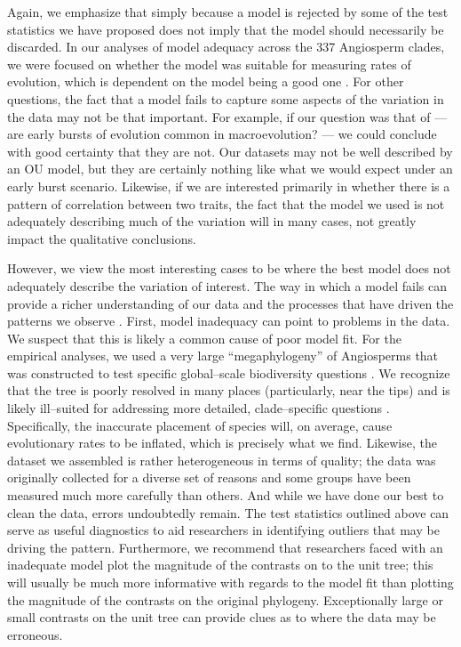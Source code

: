 \documentclass[a4paper,11pt]{article}
\begin{document}
Again, we emphasize that simply because a model is rejected by some of the test statistics we have proposed does not imply that the model should necessarily be discarded. In our analyses of model adequacy across the 337 Angiosperm clades, we were focused on whether the model was suitable for measuring rates of evolution, which is dependent on the model being a good one \citep{Hunt2012}. For other questions, the fact that a model fails to capture some aspects of the variation in the data may not be that important. For example, if our question was that of \citet{Harmon2010} --- are early bursts of evolution common in macroevolution? --- we could conclude with good certainty that they are not. Our datasets may not be well described by an OU model, but they are certainly nothing like what we would expect under an early burst scenario. Likewise, if we are interested primarily in whether there is a pattern of correlation between two traits, the fact that the model we used is not adequately describing much of the variation will in many cases, not greatly impact the qualitative conclusions.

However, we view the most interesting cases to be where the best model does not adequately describe the variation of interest. The way in which a model fails can provide a richer understanding of our data and the processes that have driven the patterns we observe \citep{Gelman2012}. First, model inadequacy can point to problems in the data. We suspect that this is likely a common cause of poor model fit. For the empirical analyses, we used a very large ``megaphylogeny'' of Angiosperms that was constructed to test specific global--scale biodiversity questions \citep{Zanne2013}. We recognize that the tree is poorly resolved in many places (particularly, near the tips) and is likely ill--suited for addressing more detailed, clade--specific questions \citep[see the recent critique by][]{DonoghueEdwards}. Specifically, the inaccurate placement of species will, on average, cause evolutionary rates to be inflated, which is precisely what we find. Likewise, the dataset we assembled is rather heterogeneous in terms of quality; the data was originally collected for a diverse set of reasons and some groups have been measured much more carefully than others. And while we have done our best to clean the data, errors undoubtedly remain. The test statistics outlined above can serve as useful diagnostics to aid researchers in identifying outliers that may be driving the pattern. Furthermore, we recommend that researchers faced with an inadequate model plot the magnitude of the contrasts on to the unit tree; this will usually be much more informative with regards to the model fit than plotting the magnitude of the contrasts on the original phylogeny. Exceptionally large or small contrasts on the unit tree can provide clues as to where the data may be erroneous.
\end{document}

